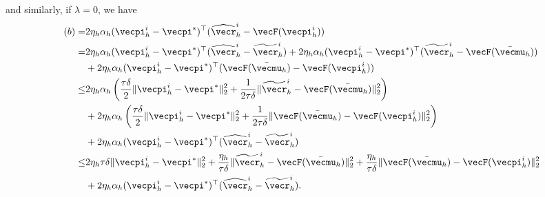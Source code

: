 and similarly, if $\lambda = 0$, we have
\begin{align*}
(b) = & 2\eta_h\alpha_h (\vecpi_h^i - \vecpi^*)^\top (\widehat{\vecr}_h^i - \vecF(\vecpi_h^i)) \\
 = & 2\eta_h\alpha_h (\vecpi_h^i - \vecpi^*)^\top (\widehat{\vecr}_h^i - \widetilde{\vecr}_h^i) + 2\eta_h\alpha_h (\vecpi_h^i - \vecpi^*)^\top (\widetilde{\vecr}_h^i - \vecF(\bar{\vecmu}_h)) \\
    & + 2\eta_h\alpha_h (\vecpi_h^i - \vecpi^*)^\top (\vecF(\bar{\vecmu}_h) - \vecF(\vecpi_h^i)) \\
\leq &2\eta_h\alpha_h \left( \frac{\tau\delta}{2} \|\vecpi_h^i - \vecpi^* \|_2^2 + \frac{1}{2\tau\delta} \|\widetilde{\vecr}_h^i - \vecF(\bar{\vecmu}_h)\|_2^2\right) \\
    & + 2\eta_h\alpha_h \left(\frac{\tau\delta}{2} \|\vecpi_h^i - \vecpi^* \|_2^2 + \frac{1}{2\tau\delta} \|\vecF(\bar{\vecmu}_h) - \vecF(\vecpi_h^i)\|_2^2 \right) \\
    &+ 2\eta_h\alpha_h (\vecpi_h^i - \vecpi^*)^\top (\widehat{\vecr}_h^i - \widetilde{\vecr}_h^i) \\
\leq & 2 \eta_h \tau\delta \|\vecpi_h^i - \vecpi^* \|_2^2 + \frac{\eta_h}{\tau\delta}\|\widetilde{\vecr}_h^i - \vecF(\bar{\vecmu}_h)\|_2^2 + \frac{\eta_h}{\tau\delta} \|\vecF(\bar{\vecmu}_h) - \vecF(\vecpi_h^i)\|_2^2 \\
    &+2\eta_h\alpha_h (\vecpi_h^i - \vecpi^*)^\top (\widehat{\vecr}_h^i - \widetilde{\vecr}_h^i).
\end{align*}

